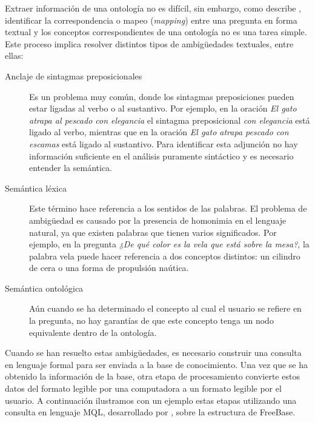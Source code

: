 Extraer información de una ontología no es difícil, sin embargo, como describe \citet{ungerQALD}, identificar la correspondencia o mapeo (\textit{mapping}) entre una pregunta en forma textual y los conceptos correspondientes de una ontología no es una tarea simple. Este proceso implica resolver distintos tipos de ambigüedades textuales, entre ellas:

\begin{description}
    \item[Anclaje de sintagmas preposicionales] Es un problema muy común, donde los sintagmas preposiciones pueden estar ligadas al verbo o al sustantivo. Por ejemplo, en la oración \textit{El gato atrapa al pescado con elegancia} el sintagma preposicional \textit{con elegancia} está ligado al verbo, mientras que en la oración \textit{El gato atrapa pescado con escamas} está ligado al sustantivo. Para identificar esta adjunción no hay información suficiente en el análisis puramente sintáctico y es necesario entender la semántica.
    \item[Semántica léxica] Este término hace referencia a los sentidos de las palabras. El problema de ambigüedad es causado por la presencia de homonimia en el lenguaje natural, ya que existen palabras que tienen varios significados. Por ejemplo, en la pregunta \textit{¿De qué color es la vela que está sobre la mesa?}, la palabra vela puede hacer referencia a dos conceptos distintos: un cilindro de cera o una forma de propulsión naútica.
    \item[Semántica ontológica] Aún cuando se ha determinado el concepto al cual el usuario se refiere en la pregunta, no hay garantías de que este concepto tenga un nodo equivalente dentro de la ontología.
\end{description}

Cuando se han resuelto estas ambigüedades, es necesario construir una consulta en lenguaje formal para ser enviada a la base de conocimiento. Una vez que se ha obtenido la información de la base, otra etapa de procesamiento convierte estos datos del formato legible por una computadora a un formato legible por el usuario. A continuación ilustramos con un ejemplo estas etapas utilizando una consulta en lenguaje MQL, desarrollado por \citet{mql}, sobre la estructura de FreeBase.

